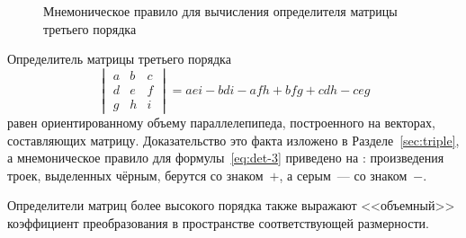     \begin{wrapfigure}[8]{r}{0.25\tw}
        \vspace{-0.2pc}
        \centering
        \caption{Мнемоническое правило для вычисления определителя матрицы третьего порядка}
        \label{pic:det-3-dim}
    \end{wrapfigure}
    Определитель матрицы третьего порядка
    \begin{equation}
        \begin{vmatrix}
            a & b & c \\
            d & e & f \\
            g & h & i
        \end{vmatrix} = aei - bdi - afh + bfg + cdh - ceg
        \label{eq:det-3}
    \end{equation}
    равен ориентированному объему параллелепипеда, построенного на векторах, составляющих матрицу. Доказательство это факта изложено в Разделе~\ref{sec:triple}, а мнемоническое правило для формулы~\eqref{eq:det-3} приведено на : произведения троек, выделенных чёрным, берутся со знаком~$+$, а серым~--- со знаком~$-$.
    
    Определители матриц более высокого порядка также выражают <<объемный>> коэффициент преобразования в пространстве соответствующей размерности.
    
